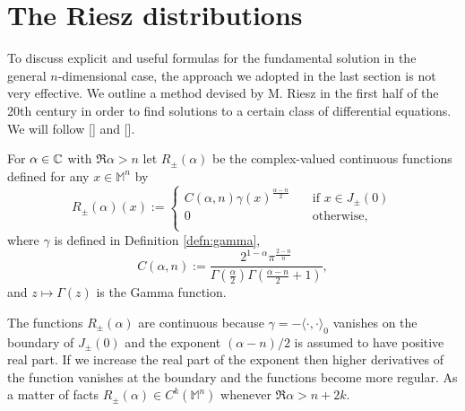 \section{The Riesz distributions}
\label{sec:riesz}

To discuss explicit and useful formulas for the fundamental solution in the general $n$-dimensional case, the approach we adopted in the last section is not very effective. We outline a method devised by M. Riesz in the first half of the 20th century in order to find solutions to a certain class of differential equations. We will follow [\citealp{ginoux}] and [\citealp[Ch. 1.3]{bar2}].
\begin{definition}
	For $\alpha\in{\mathbb C}$ with $\Re\alpha>n$ let $R_\pm(\alpha)$ be the complex-valued continuous functions defined for any $x\in\mathbb{M}^n$ by
	\begin{equation}
		R_\pm(\alpha)(x):=\begin{cases}
		C(\alpha,n)\gamma(x)^{\frac{\alpha-n}{2}}\quad &\text{if }x\in J_{\pm}(0)\\
		0\qquad &\text{otherwise},\\
		\end{cases}
	\end{equation}
	where $\gamma$ is defined in Definition \ref{defn:gamma},
	\[	C(\alpha,n):=\frac{2^{1-\alpha}\pi^{\frac{2-n}{n}}}{\Gamma(\frac\alpha{2})\Gamma(\frac{\alpha-n}{2}+1)},		\]
	and $z\mapsto \Gamma(z)$ is the Gamma function.
	\label{defn:Rieszmink}
\end{definition}
\begin{rem}
	The functions $R_\pm(\alpha)$ are continuous because $\gamma=-\langle\cdot,\cdot\rangle_0$ vanishes on the boundary of $J_{\pm}(0)$ and the exponent $(\alpha-n)/2$ is assumed to have positive real part. If we increase the real part of the exponent then higher derivatives of the function vanishes at the boundary and the functions become more regular. As a matter of facts $R_\pm(\alpha)\in C^k(\mathbb{M}^n)$ whenever $\Re\alpha>n+2k$.
	\label{rem:regRiesz}
\end{rem}

